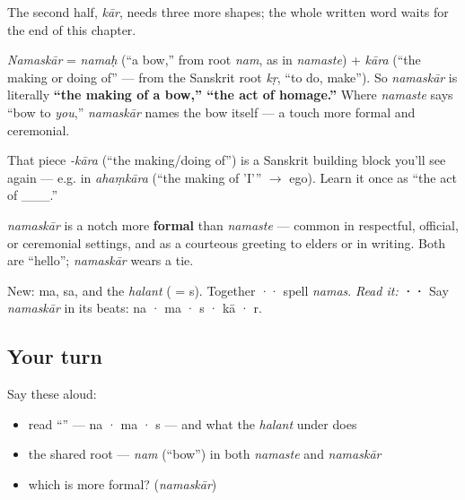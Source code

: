 The second half, \emph{kār}, needs three more shapes; the whole written word waits for the end of this chapter.

\begin{cousinweb}
\emph{Namaskār} = \emph{namaḥ} (\textquotedblleft{}a bow,\textquotedblright{} from root \textbf{} \emph{nam}, as in \emph{namaste}) + \emph{kāra} (\textquotedblleft{}the making or doing of\textquotedblright{} — from the Sanskrit root \emph{kṛ}, \textquotedblleft{}to do, make\textquotedblright{}). So \emph{namaskār} is literally \textbf{\textquotedblleft{}the making of a bow,\textquotedblright{} \textquotedblleft{}the act of homage.\textquotedblright{}} Where \emph{namaste} says \textquotedblleft{}bow to \emph{you},\textquotedblright{} \emph{namaskār} names the bow itself — a touch more formal and ceremonial.

That piece \emph{-kāra} (\textquotedblleft{}the making/doing of\textquotedblright{}) is a Sanskrit building block you'll see again — e.g. in \emph{ahaṃkāra} (\textquotedblleft{}the making of 'I'\textquotedblright{} $\to$ ego). Learn it once as \textquotedblleft{}the act of \_\_\_.\textquotedblright{}
\end{cousinweb}

\begin{culture}
\emph{namaskār} is a notch more \textbf{formal} than \emph{namaste} — common in respectful, official, or ceremonial settings, and as a courteous greeting to elders or in writing. Both are \textquotedblleft{}hello\textquotedblright{}; \emph{namaskār} wears a tie.
\end{culture}

\begin{sounds}
New:  ma,  sa, and the \emph{halant}  ( = s). Together ·· spell \emph{namas}. \emph{Read it:} \textbf{··} Say \emph{namaskār} in its beats: na · ma · s · kā · r.
\end{sounds}

\subsection*{Your turn}
Say these aloud:

\begin{itemize}
\raggedright
  \item read \textquotedblleft{}\textquotedblright{} — na · ma · s — and what the \emph{halant} under  does
  \item the shared root — \emph{nam} (\textquotedblleft{}bow\textquotedblright{}) in both \emph{namaste} and \emph{namaskār}
  \item which is more formal? (\emph{namaskār})
\end{itemize}

